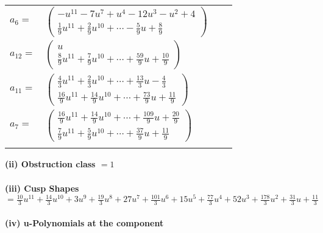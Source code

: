 \documentclass[1p]{elsarticle_modified}
\theoremstyle{definition}
\begin{document}
\begin{tabular}{m{7pt} m{180pt} m{7pt} m{180pt} }
\flushright $a_{6}=$&$\begin{pmatrix}- u^{11}-7 u^7+u^4-12 u^3- u^2+4\\\frac{1}{9} u^{11}+\frac{2}{9} u^{10}+\cdots-\frac{5}{9} u+\frac{8}{9}\end{pmatrix}$ \\
\flushright $a_{12}=$&$\begin{pmatrix}u\\\frac{8}{9} u^{11}+\frac{7}{9} u^{10}+\cdots+\frac{59}{9} u+\frac{10}{9}\end{pmatrix}$ \\
\flushright $a_{11}=$&$\begin{pmatrix}\frac{4}{3} u^{11}+\frac{2}{3} u^{10}+\cdots+\frac{13}{3} u-\frac{4}{3}\\\frac{16}{9} u^{11}+\frac{14}{9} u^{10}+\cdots+\frac{73}{9} u+\frac{11}{9}\end{pmatrix}$ \\
\flushright $a_{7}=$&$\begin{pmatrix}\frac{16}{9} u^{11}+\frac{14}{9} u^{10}+\cdots+\frac{109}{9} u+\frac{20}{9}\\\frac{7}{9} u^{11}+\frac{5}{9} u^{10}+\cdots+\frac{37}{9} u+\frac{11}{9}\end{pmatrix}$\\&\end{tabular}
\flushleft \textbf{(ii) Obstruction class $= 1$}\\~\\
\flushleft \textbf{(iii) Cusp Shapes $= \frac{10}{3} u^{11}+\frac{14}{3} u^{10}+3 u^9+\frac{19}{3} u^8+27 u^7+\frac{101}{3} u^6+15 u^5+\frac{77}{3} u^4+52 u^3+\frac{178}{3} u^2+\frac{31}{3} u+\frac{11}{3}$}\\~\\
\newpage\renewcommand{\arraystretch}{1}
\flushleft \textbf{(iv) u-Polynomials at the component}\newline \\
\end{document}
